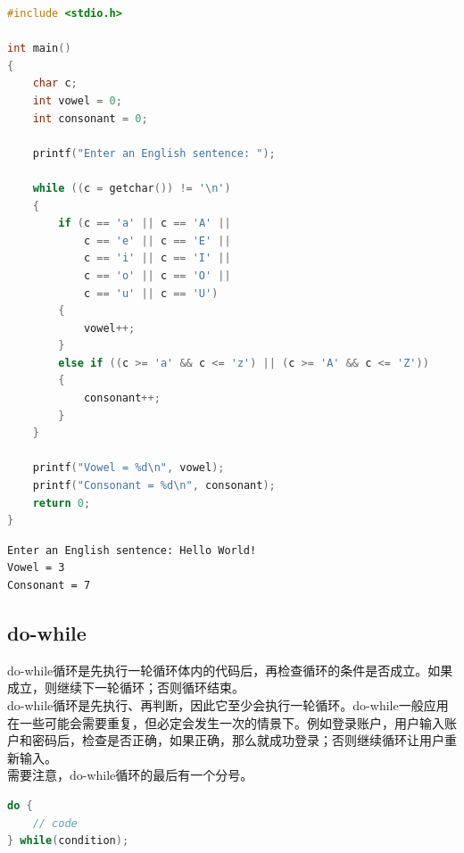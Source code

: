 \vspace{0.5cm}


\begin{lstlisting}[language=C]
#include <stdio.h>

int main()
{
    char c;
    int vowel = 0;
    int consonant = 0;

    printf("Enter an English sentence: ");

    while ((c = getchar()) != '\n')
    {
        if (c == 'a' || c == 'A' ||
            c == 'e' || c == 'E' || 
            c == 'i' || c == 'I' || 
            c == 'o' || c == 'O' || 
            c == 'u' || c == 'U')
        {
            vowel++;
        }
        else if ((c >= 'a' && c <= 'z') || (c >= 'A' && c <= 'Z'))
        {
            consonant++;
        }
    }

    printf("Vowel = %d\n", vowel);
    printf("Consonant = %d\n", consonant);
    return 0;
}
\end{lstlisting}

\begin{tcolorbox}
    \begin{verbatim}
Enter an English sentence: Hello World!
Vowel = 3
Consonant = 7
\end{verbatim}
\end{tcolorbox}

\vspace{0.5cm}

\subsection{do-while}

do-while循环是先执行一轮循环体内的代码后，再检查循环的条件是否成立。如果成立，则继续下一轮循环；否则循环结束。\\

do-while循环是先执行、再判断，因此它至少会执行一轮循环。do-while一般应用在一些可能会需要重复，但必定会发生一次的情景下。例如登录账户，用户输入账户和密码后，检查是否正确，如果正确，那么就成功登录；否则继续循环让用户重新输入。\\

需要注意，do-while循环的最后有一个分号。

\begin{lstlisting}[language=C]
do {
    // code
} while(condition);
\end{lstlisting}

\vspace{0.5cm}

